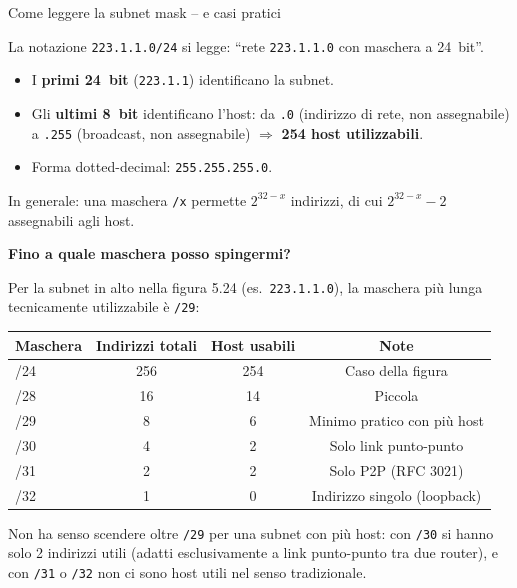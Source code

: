 \documentclass[a4paper,12pt]{report}
\begin{document}
\begin{esempiobox}{Come leggere la subnet mask -- e casi pratici}

La notazione \texttt{223.1.1.0/24} si legge: ``rete
\texttt{223.1.1.0} con maschera a 24~bit''.
\begin{itemize}
    \item I \textbf{primi 24~bit} (\texttt{223.1.1}) identificano
          la subnet.
    \item Gli \textbf{ultimi 8~bit} identificano l'host: da
          \texttt{.0} (indirizzo di rete, non assegnabile) a
          \texttt{.255} (broadcast, non assegnabile) $\Rightarrow$
          \textbf{254 host utilizzabili}.
    \item Forma dotted-decimal: \texttt{255.255.255.0}.
\end{itemize}

In generale: una maschera \texttt{/x} permette $2^{32-x}$
indirizzi, di cui $2^{32-x}-2$ assegnabili agli host.

\vspace{0.4em}
\textbf{Fino a quale maschera posso spingermi?}

Per la subnet in alto nella figura {5.24} (es.\
\texttt{223.1.1.0}), la maschera più lunga tecnicamente
utilizzabile è \texttt{/29}:
\begin{center}
\begin{tabular}{lccc}
\toprule
\textbf{Maschera} & \textbf{Indirizzi totali} &
\textbf{Host usabili} & \textbf{Note} \\
\midrule
/24 & 256 & 254 & Caso della figura \\
/28 & 16  & 14  & Piccola \\
/29 & 8   & 6   & Minimo pratico con più host \\
/30 & 4   & 2   & Solo link punto-punto \\
/31 & 2   & 2   & Solo P2P (RFC 3021) \\
/32 & 1   & 0   & Indirizzo singolo (loopback) \\
\bottomrule
\end{tabular}
\end{center}
Non ha senso scendere oltre \texttt{/29} per una subnet con più
host: con \texttt{/30} si hanno solo 2 indirizzi utili (adatti
esclusivamente a link punto-punto tra due router), e con
\texttt{/31} o \texttt{/32} non ci sono host utili nel senso
tradizionale.

\end{esempiobox}
\newpage
\end{document}
